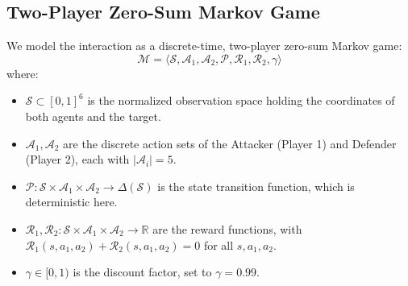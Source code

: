 \documentclass[conference]{IEEEtran}
\begin{document}
\subsection{Two-Player Zero-Sum Markov Game}
We model the interaction as a discrete-time, two-player zero-sum Markov game:
\begin{equation}
\mathcal{M} = \langle \mathcal{S}, \mathcal{A}_1, \mathcal{A}_2, \mathcal{P}, \mathcal{R}_1, \mathcal{R}_2, \gamma \rangle
\end{equation}
where:
\begin{itemize}
    \item $\mathcal{S} \subset [0, 1]^6$ is the normalized observation space holding the coordinates of both agents and the target.
    \item $\mathcal{A}_1, \mathcal{A}_2$ are the discrete action sets of the Attacker (Player 1) and Defender (Player 2), each with $|\mathcal{A}_i| = 5$.
    \item $\mathcal{P}: \mathcal{S} \times \mathcal{A}_1 \times \mathcal{A}_2 \to \Delta(\mathcal{S})$ is the state transition function, which is deterministic here.
    \item $\mathcal{R}_1, \mathcal{R}_2: \mathcal{S} \times \mathcal{A}_1 \times \mathcal{A}_2 \to \mathbb{R}$ are the reward functions, with $\mathcal{R}_1(s, a_1, a_2) + \mathcal{R}_2(s, a_1, a_2) = 0$ for all $s, a_1, a_2$.
    \item $\gamma \in [0, 1)$ is the discount factor, set to $\gamma = 0.99$.
\end{itemize}
\end{document}
